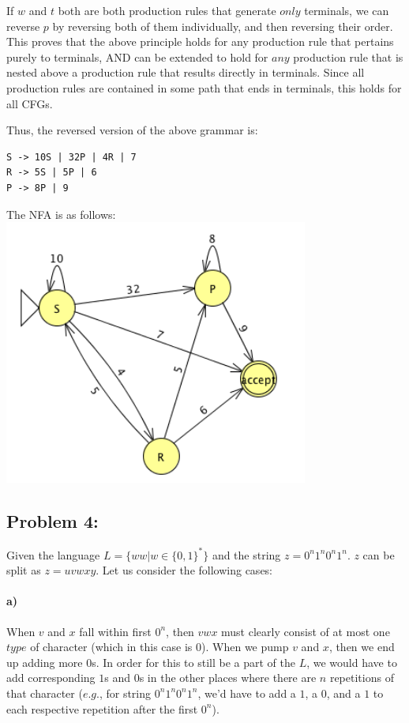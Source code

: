 \documentclass[a4paper]{article}
\begin{document}
If $w$ and $t$ both are both production rules that generate $\textit{only}$ terminals, we can reverse $p$ by reversing both of them individually, and then reversing their order. This proves that the above principle holds for any production rule that pertains purely to terminals, AND can be extended to hold for $\textit{any}$ production rule that is nested above a production rule that results directly in terminals. Since all production rules are contained in some path that ends in terminals, this holds for all CFGs.

Thus, the reversed version of the above grammar is:

\begin{verbatim}
S -> 10S | 32P | 4R | 7
R -> 5S | 5P | 6
P -> 8P | 9
\end{verbatim}

The NFA is as follows: \\
\includegraphics[width=100mm]{3_nfa.png}

\subsection*{Problem 4:}

Given the language $L = \{ww | w \in \{0,1\}^*\}$ and the string $z = 0^n 1^n 0^n 1^n$. $z$ can be split as $z = uvwxy$. Let us consider the following cases:

\paragraph{a)} When $v$ and $x$ fall within first $0^n$, then $vwx$ must clearly consist of at most one $\textit{type}$ of character (which in this case is $0$). When we pump $v$ and $x$, then we end up adding more $0$s. In order for this to still be a part of the $L$, we would have to add corresponding $1$s and $0$s in the other places where there are $n$ repetitions of that character ($\textit{e.g.}$, for string $0^n 1^n 0^n 1^n$, we'd have to add a $1$, a $0$, and a $1$ to each respective repetition after the first $0^n$).
\end{document}
